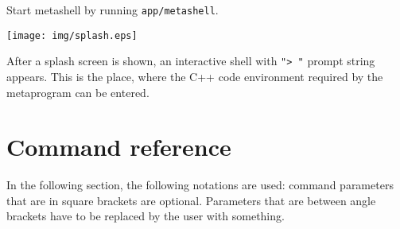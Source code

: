 Start metashell by running \lstinline$app/metashell$.

\texttt{[image: img/splash.eps]}

After a splash screen is shown, an interactive shell with \lstinline$"> "$
prompt string appears. This is the place, where the C++ code environment
required by the metaprogram can be entered.



\section{Command reference}

In the following section, the following notations are used: command parameters
that are in square brackets are optional. Parameters that are between angle
brackets have to be replaced by the user with something.



